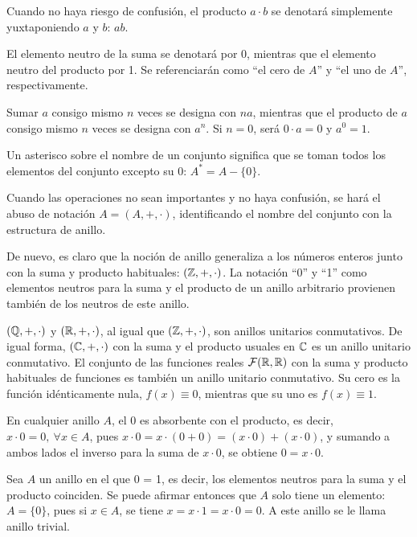 \begin{nott} 
        \item Cuando no haya riesgo de confusión, el producto $a \cdot b$ se denotará simplemente yuxtaponiendo $a$ y $b$: $ab$.
        \item El elemento neutro de la suma se denotará por 0, mientras que el elemento neutro del producto por 1. Se referenciarán como ``el cero de $A$'' y ``el uno de $A$'', respectivamente.
        \item Sumar $a$ consigo mismo $n$ veces se designa con $na$, mientras que el producto de $a$ consigo mismo $n$ veces se designa con $a^n$. Si $n = 0$, será $0\cdot a = 0$ y $a^0 = 1$.
        \item Un asterisco sobre el nombre de un conjunto significa que se toman todos los elementos del conjunto excepto su 0: $A^* = A - \{0\}$.
        \item Cuando las operaciones no sean importantes y no haya confusión, se hará el abuso de notación $A = (A, +, \cdot)$, identificando el nombre del conjunto con la estructura de anillo.
  \end{nott}

\begin{obs}
    De nuevo, es claro que la noción de anillo generaliza a los números enteros junto con la suma y producto habituales: $(\mathbb{Z},+, \cdot)$. La notación ``0'' y ``1'' como elementos neutros para la suma y el producto de un anillo arbitrario provienen también de los neutros de este anillo.
\end{obs}
    
\begin{ejs}
    \item$(\mathbb{Q},+, \cdot)$ y $(\mathbb{R},+, \cdot)$, al igual que $(\mathbb{Z},+, \cdot)$, son anillos unitarios conmutativos. De igual forma, $(\mathbb{C},+, \cdot)$ con la suma y el producto usuales en $\mathbb{C}$ es un anillo unitario conmutativo. El conjunto de las funciones reales $\mathcal{F}(\mathbb{R}, \mathbb{R})$ con la suma y producto habituales de funciones es también un anillo unitario conmutativo. Su cero es la función idénticamente nula, $f(x) \equiv 0$, mientras que su uno es $f(x) \equiv 1$.

    \item En cualquier anillo $A$, el 0 es absorbente con el producto, es decir, $x\cdot0 = 0,\ \forall x\in A$, pues $x\cdot 0 = x \cdot (0 + 0) = (x\cdot0) + (x\cdot 0)$, y sumando a ambos lados el inverso para la suma de $x\cdot 0$, se obtiene $0 = x \cdot 0$.
    
    \item Sea $A$ un anillo en el que 0 = 1, es decir, los elementos neutros para la suma y el producto coinciden. Se puede afirmar entonces que $A$ solo tiene un elemento: $A = \{0\}$, pues si $x\in A$, se tiene $x = x\cdot 1 = x\cdot0 = 0$. A este anillo se le llama anillo trivial.   
\end{ejs}


